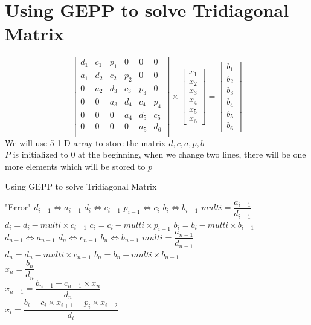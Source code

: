 \documentclass [9 pt]{article}
\theoremstyle{definition}
\begin{document}
\newpage
\section*{Using GEPP to solve Tridiagonal Matrix}
\renewcommand\arraystretch{1.5}
$$\begin{bmatrix}
	d_1 & c_1 & p_1 & 0 & 0 &0\\
	a_1 & d_2 & c_2 & p_2 & 0 &0\\
	0 & a_2 & d_3 & c_3 & p_3 &0\\
	0 & 0 & a_3 & d_4 & c_4 &p_4\\
	0 & 0 & 0 & a_4 & d_5 &c_5\\ 
	0 & 0 & 0 & 0 & a_5 &d_6\\ 	
\end{bmatrix} \times \begin{bmatrix}
	x_1\\
	x_2\\
	x_3\\
	x_4\\
	x_5\\
	x_6
\end{bmatrix} = \begin{bmatrix}
	b_1\\
	b_2\\
	b_3\\
	b_4\\
	b_5\\
	b_6
\end{bmatrix} $$
We will use 5 1-D array to store the matrix $d, c, a, p, b$\\
$P$ is initialized to 0 at the beginning, when we change two lines, there will be one more elements which will be stored to $p$
\begin{algorithm}
  \caption{Using GEPP to solve Tridiagonal Matrix}
  \begin{algorithmic}[1]
			\State "Error"
		\EndIf
			\State $d_{i - 1} \Leftrightarrow a_{i - 1}$
			\State $d_{i } \Leftrightarrow c_{i - 1}$
			\State $p_{i - 1} \Leftrightarrow c_{i }$
			\State $b_{i } \Leftrightarrow b_{i - 1}$
		\EndIf
		\State $multi = \dfrac{a_{i-1}}{d_{i-1}}$\\
		\State $d_i = d_i - multi \times c_{i-1}$
		\State $c_i = c_i - multi \times p_{i-1}$
		\State $b_i = b_i - multi \times b_{i-1}$
	\EndFor\\
			\State $d_{n - 1} \Leftrightarrow a_{n - 1}$
			\State $d_{n } \Leftrightarrow c_{n - 1}$
			\State $b_{n } \Leftrightarrow b_{n - 1}$
		\EndIf
		\State $multi = \dfrac{a_{n-1}}{d_{n-1}}$\\
		\State $d_n = d_n - multi \times c_{n-1}$
		\State $b_n = b_n - multi \times b_{n-1}$
\\	
	\State $x_n = \dfrac{b_n}{d_n}$
	\\
	\State $x_{n-1} = \dfrac{b_{n-1} - c_{n - 1 }\times x_n}{d_n}$
	\\
		\State $x_i = \dfrac{b_i - c_i \times x_{i+1} - p_i \times x_{i+2}}{d_i}$
	\\
	\EndFor
  \end{algorithmic}
\end{algorithm}
\end{document}
